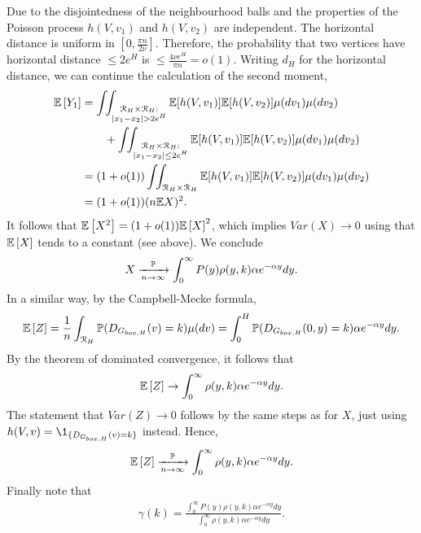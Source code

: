 Due to the disjointedness of the neighbourhood balls and the properties of the Poisson process $h(V,v_1)$ and $h(V,v_2)$ are independent. The horizontal distance is uniform in $[0,\frac{\pi n}{2\nu}]$. Therefore, the probability that two vertices have horizontal distance $\leq 2e^H$ is $\leq \frac{4\nu e^H}{\pi n} = o(1)$. Writing $d_H$ for the horizontal distance, we can continue the calculation of the second moment,
\begin{align*}
\Exp{ Y_1} &= \int_{} \int_{\substack{\Rcal_H\times \Rcal_H:\\ |x_1-x_2|>2 e^H}} \E[ h(V,v_1)]\E[h(V,v_2)]\mu(dv_1)\mu(dv_2)\\
&\qquad+\int_{} \int_{\substack{\Rcal_H\times \Rcal_H:\\ |x_1-x_2|\leq2 e^H}} \E[ h(V,v_1)]\E[h(V,v_2)]\mu(dv_1)\mu(dv_2) \\
&= (1+o(1))\int_{} \int_{\Rcal_H\times \Rcal_H} \E[ h(V,v_1)]\E[h(V,v_2)]\mu(dv_1)\mu(dv_2) \\
&= (1+o(1)) (n\E X)^2.
\end{align*}
It follows that $\mathbb{E}\left[ X^2\right] = (1+o(1))\mathbb{E}\left[ X\right]^2$, which implies $Var(X) \rightarrow 0$ using that $\mathbb{E}\left[ X\right]$ tends to a constant (see above). We conclude
\[
	X \xrightarrow[n\rightarrow\infty]{\mathbb{P}} \int_0^\infty P(y)\rho(y,k)\alpha e^{-\alpha y}dy.
\]
In a similar way, by the Campbell-Mecke formula,
\begin{align*}
\mathbb{E}\left[Z\right] =\frac{1}{n} \int_{{\mathcal R}_H} \mathbb{P}(D_{G_{box,H}}(v)=k) \mu(dv) = \int_0^H \mathbb{P}(D_{G_{box,H}}(0,y)=k) \alpha e^{-\alpha y}dy.
\end{align*}
By the theorem of dominated convergence, it follows that
\begin{align*}
\mathbb{E}\left[ Z\right] \rightarrow \int_0^\infty \rho(y,k)\alpha e^{-\alpha y}dy.
\end{align*}
The statement that $Var(Z) \rightarrow 0$ follows by the same steps as for $X$, just using $h(V,v) = \1_{\{D_{\GboxH}(v)=k\}}$ instead. Hence,
\begin{align*}
\mathbb{E}\left[ Z\right] \xrightarrow[n\rightarrow\infty]{\mathbb{P}} \int_0^\infty \rho(y,k)\alpha e^{-\alpha y}dy.
\end{align*}
Finally note that 
\begin{align*}
\gamma(k) = \frac{\int_0^\infty P(y)\rho(y,k)\alpha e^{-\alpha y}dy}{\int_0^\infty \rho(y,k)\alpha e^{-\alpha y}dy}.
\end{align*}

